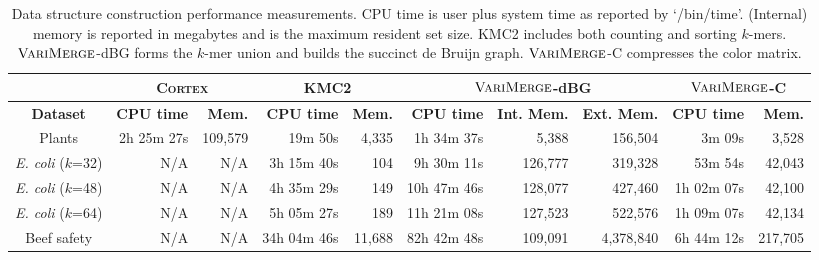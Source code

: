 \begin{sidewayspage}
\begin{table}[h]

\caption{Data structure construction performance measurements.  CPU time is user plus system time as reported by `/bin/time'.  (Internal) memory is reported in megabytes and is the maximum resident set size. KMC2 includes both counting and sorting $k$-mers. $\mbox{\rm {\sc VariMerge}}$-dBG forms the $k$-mer union and builds the succinct de Bruijn graph. $\mbox{\rm {\sc VariMerge}}$-C compresses the color matrix.}
\centering
  \begin{tabular}{|c|r|r|r|r|r|r|r|r|r|}

\hline
\multicolumn{1}{|l}{}
& \multicolumn{2}{|c|}{\textsc{Cortex}}
& \multicolumn{2}{|c|}{KMC2}
& \multicolumn{3}{|c|}{$\mbox{\rm {\sc VariMerge}}$-dBG}
& \multicolumn{2}{|c|}{$\mbox{\rm {\sc VariMerge}}$-C}  \\
\hline
{\bf Dataset} & {\bf CPU time} & {\bf Mem.} & {\bf CPU time} & {\bf Mem.} &{\bf CPU time} & {\bf Int. Mem.} & {\bf Ext. Mem.} & {\bf CPU time} & {\bf Mem.}  \\
\hline
Plants & 2h 25m 27s & 109,579 &  19m 50s & 4,335 & 1h 34m 37s & 5,388 & 156,504 & 3m 09s & 3,528 \\




\emph{E. coli} ($k$=32)         & N/A & N/A & 3h 15m 40s & 104 & 9h 30m 11s & 126,777 & 319,328 &  53m 54s & 42,043 \\



\emph{E. coli} ($k$=48)         & N/A & N/A & 4h 35m 29s & 149 & 10h 47m 46s & 128,077 & 427,460 & 1h 02m 07s & 42,100 \\


\emph{E. coli} ($k$=64)         & N/A & N/A & 5h 05m 27s & 189 & 11h 21m 08s & 127,523 & 522,576 & 1h 09m 07s & 42,134 \\

Beef safety & N/A & N/A & 34h 04m 46s & 11,688 & 82h 42m 48s & 109,091 & 4,378,840 & 6h 44m 12s & 217,705 \\

\hline
  \end{tabular}
\label{tbl-buildper}

\end{table}

\end{sidewayspage}







